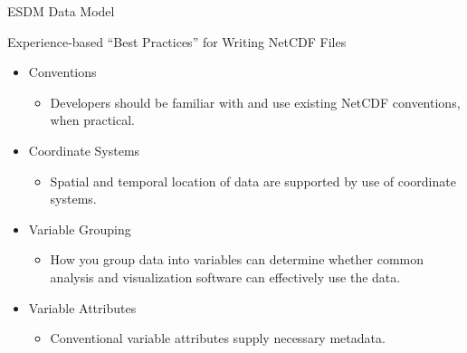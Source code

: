 \documentclass[compress,11pt,xcolor=svgnames,aspectratio=169]{beamer}
\begin{document}
\begin{frame}[t]{ESDM Data Model}

\begin{center}
\end{center}

\end{frame}

\begin{frame}[t]{Experience-based ``Best Practices'' for Writing NetCDF Files}

    \begin{itemize}
    \setlength\itemsep{0.3cm}

        \item	Conventions
        \begin{itemize}
          \item Developers should be familiar with and use existing NetCDF conventions, when practical.
        \end{itemize}

        \item	Coordinate Systems
        \begin{itemize}
          \item Spatial and temporal location of data are supported by use of coordinate systems.
        \end{itemize}

        \item	Variable Grouping
        \begin{itemize}
          \item How you group data into variables can determine whether common analysis and visualization software can effectively use the data.
        \end{itemize}

        \item	Variable Attributes
        \begin{itemize}
          \item Conventional variable attributes supply necessary metadata.
        \end{itemize}

    \end{itemize}

\end{frame}
\end{document}
